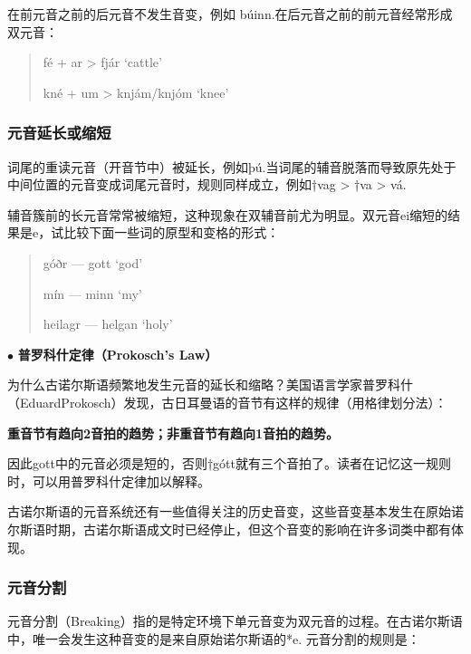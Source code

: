 在前元音之前的后元音不发生音变，例如 búinn.在后元音之前的前元音经常形成双元音：

\begin{quote}
  fé + ar > fjár `cattle'

  kné + um > knjám/knjóm `knee'
\end{quote}

\subsubsection{元音延长或缩短}
\label{元音延长或缩短}

词尾的重读元音（开音节中）被延长，例如þú.当词尾的辅音脱落而导致原先处于中间位置的元音变成词尾元音时，规则同样成立，例如†vag > †va > vá.

辅音簇前的长元音常常被缩短，这种现象在双辅音前尤为明显。双元音ei缩短的结果是e，试比较下面一些词的原型和变格的形式：

\begin{quote}
  góðr --- gott `god'

  mín --- minn `my'

  heilagr --- helgan `holy'
\end{quote}

\begin{info}
  $\bullet$ \textbf{普罗科什定律（Prokosch's Law）}

  \indent
  为什么古诺尔斯语频繁地发生元音的延长和缩略？美国语言学家普罗科什（EduardProkosch）发现，古日耳曼语的音节有这样的规律（用格律划分法）：

  \indent
  \textbf{重音节有趋向2音拍的趋势；非重音节有趋向1音拍的趋势。}

  \indent
  因此gott中的元音必须是短的，否则†gótt就有三个音拍了\footnotemark[3]。读者在记忆这一规则时，可以用普罗科什定律加以解释。
\end{info}


古诺尔斯语的元音系统还有一些值得关注的历史音变，这些音变基本发生在原始诺尔斯语时期，古诺尔斯语成文时已经停止，但这个音变的影响在许多词类中都有体现。

\subsubsection{元音分割}
\label{元音分割}

元音分割（Breaking）指的是特定环境下单元音变为双元音的过程。在古诺尔斯语中，唯一会发生这种音变的是来自原始诺尔斯语的*e. 元音分割的规则是：

